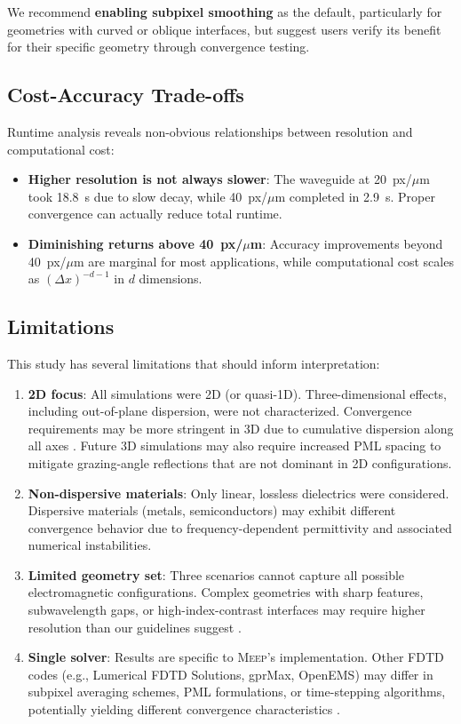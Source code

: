 \documentclass[12pt, a4paper]{article}
\newcommand{\meep}{\textsc{Meep}}
\newcommand{\fdtd}{\textsc{FDTD}}
\begin{document}
We recommend \textbf{enabling subpixel smoothing} as the default, particularly for geometries with curved or oblique interfaces, but suggest users verify its benefit for their specific geometry through convergence testing.

\subsection{Cost-Accuracy Trade-offs}

Runtime analysis reveals non-obvious relationships between resolution and computational cost:

\begin{itemize}
    \item \textbf{Higher resolution is not always slower}: The waveguide at 20~px/$\mu$m took 18.8~s due to slow decay, while 40~px/$\mu$m completed in 2.9~s. Proper convergence can actually reduce total runtime.
    \item \textbf{Diminishing returns above 40~px/$\mu$m}: Accuracy improvements beyond 40~px/$\mu$m are marginal for most applications, while computational cost scales as $(\Delta x)^{-d-1}$ in $d$ dimensions.
\end{itemize}

\subsection{Limitations}

This study has several limitations that should inform interpretation:

\begin{enumerate}
    \item \textbf{2D focus}: All simulations were 2D (or quasi-1D). Three-dimensional effects, including out-of-plane dispersion, were not characterized. Convergence requirements may be more stringent in 3D due to cumulative dispersion along all axes \citep{Taflove2005}. Future 3D simulations may also require increased PML spacing to mitigate grazing-angle reflections that are not dominant in 2D configurations.
    \item \textbf{Non-dispersive materials}: Only linear, lossless dielectrics were considered. Dispersive materials (metals, semiconductors) may exhibit different convergence behavior due to frequency-dependent permittivity and associated numerical instabilities.
    \item \textbf{Limited geometry set}: Three scenarios cannot capture all possible electromagnetic configurations. Complex geometries with sharp features, subwavelength gaps, or high-index-contrast interfaces may require higher resolution than our guidelines suggest \citep{KunzLuebbers1993}.
    \item \textbf{Single solver}: Results are specific to \meep{}'s implementation. Other \fdtd{} codes (e.g., Lumerical FDTD Solutions, gprMax, OpenEMS) may differ in subpixel averaging schemes, PML formulations, or time-stepping algorithms, potentially yielding different convergence characteristics \citep{Silva2021}.
\end{enumerate}
\end{document}
